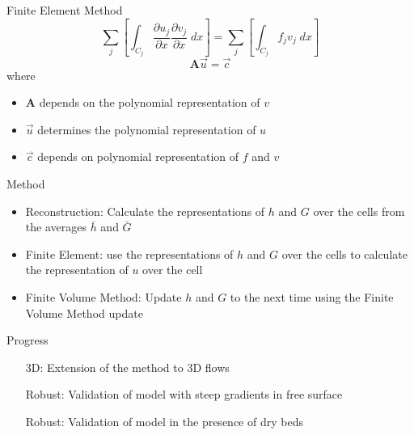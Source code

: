 \documentclass[pdf]{beamer}
\begin{document}
\begin{frame}{Finite Element Method}
	\[
	  \sum_j  \left[\int_{C_j} \frac{\partial {u_j }}{\partial x} \frac{\partial {v_j }}{\partial x} \; dx\right]  = \sum_j \left[ \int_{C_j} f_j v_j  \; dx \right]
	\]
	\begin{equation*}
	\boldsymbol{A} \vec{u} = \vec{c}
	\end{equation*}
	where 
	\begin{itemize}
		\item $\boldsymbol{A}$ depends on the polynomial representation of $v$
		\item $\vec{u}$ determines the polynomial representation of $u$
		\item $\vec{c}$ depends on polynomial representation of $f$ and $v$
	\end{itemize}
\end{frame}


\begin{frame}{Method}
	\begin{itemize}
		\item Reconstruction: Calculate the representations of $h$ and $G$ over the cells from the averages $\bar{h}$ and $\bar{G}$
		\item Finite Element: use the representations of $h$ and $G$ over the cells to calculate the representation of $u$ over the cell
		\item Finite Volume Method: Update $h$ and $G$ to the next time using the Finite Volume Method update
	\end{itemize}
\end{frame}

\begin{frame}{Progress}
	\begin{itemize}
		\item[3D:] Extension of the method to 3D flows  \checkmark
		\item[Robust:] Validation of model with steep gradients in free surface
		\item[Robust:] Validation of model in the presence of dry beds
	\end{itemize}
\end{frame}
\end{document}
